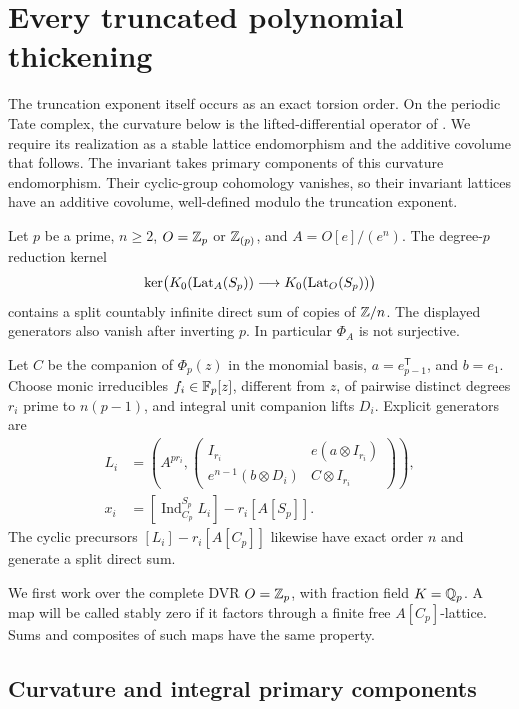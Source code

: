 \section{Every truncated polynomial thickening}
\label{sec:all-truncations}

The truncation exponent itself occurs as an exact torsion order.
On the periodic Tate complex, the curvature below is the
lifted-differential operator of
\citet[Section~1, p.~39; Proposition~1.3 and Corollary~1.4,
pp.~40--41]{Eisenbud1980}.  We require its realization as a stable
lattice endomorphism and the additive covolume that follows.
The invariant takes primary components of this curvature
endomorphism.  Their cyclic-group cohomology vanishes, so their
invariant lattices have an additive covolume, well-defined modulo
the truncation exponent.

\begin{theorem}\label{thm:all-truncations}
Let $p$ be a prime, $n\ge2$, $O=\mathbb Z_p$ or $\mathbb Z_{(p)}$, and
$A=O[e]/(e^n)$.  The degree-$p$ reduction kernel
\[
 \ker\bigl(K_0(\operatorname{Lat}_A(S_p))\longrightarrow
                 K_0(\operatorname{Lat}_O(S_p))\bigr)
\]
contains a split countably infinite direct sum of copies of $\mathbb Z/n$.
The displayed generators also vanish after inverting $p$.
In particular $\Phi_A$ is not surjective.

Let $C$ be the companion of $\Phi_p(z)$ in the monomial basis,
$a=e_{p-1}^{\mathsf T}$, and $b=e_1$.
Choose monic irreducibles $f_i\in\mathbb F_p[z]$, different from $z$,
of pairwise distinct degrees $r_i$ prime to $n(p-1)$, and integral
unit companion lifts $D_i$.  Explicit generators are
\[
 \begin{split}
 L_i&=\left(A^{pr_i},
 \begin{pmatrix}
 I_{r_i}&e(a\otimes I_{r_i})\\
 e^{n-1}(b\otimes D_i)&C\otimes I_{r_i}
 \end{pmatrix}\right),\\
 x_i&=[\operatorname{Ind}_{C_p}^{S_p}L_i]-r_i[A[S_p]].
 \end{split}
\]
The cyclic precursors $[L_i]-r_i[A[C_p]]$ likewise have exact
order $n$ and generate a split direct sum.
\end{theorem}

We first work over the complete DVR $O=\mathbb Z_p$, with fraction field
$K=\mathbb Q_p$.  A map will be called stably zero if it factors through
a finite free $A[C_p]$-lattice.  Sums and composites of such maps
have the same property.

\subsection{Curvature and integral primary components}

